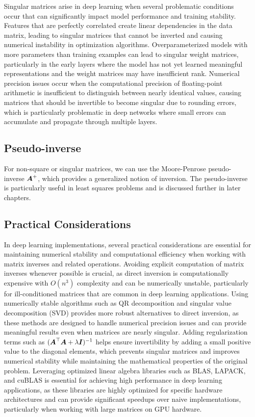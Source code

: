 Singular matrices arise in deep learning when several problematic conditions occur that can significantly impact model performance and training stability. Features that are perfectly correlated create linear dependencies in the data matrix, leading to singular matrices that cannot be inverted and causing numerical instability in optimization algorithms. Overparameterized models with more parameters than training examples can lead to singular weight matrices, particularly in the early layers where the model has not yet learned meaningful representations and the weight matrices may have insufficient rank. Numerical precision issues occur when the computational precision of floating-point arithmetic is insufficient to distinguish between nearly identical values, causing matrices that should be invertible to become singular due to rounding errors, which is particularly problematic in deep networks where small errors can accumulate and propagate through multiple layers.

\subsection{Pseudo-inverse}

For non-square or singular matrices, we can use the Moore-Penrose pseudo-inverse $\boldsymbol{A}^+$, which provides a generalized notion of inversion. The pseudo-inverse is particularly useful in least squares problems and is discussed further in later chapters.

\subsection{Practical Considerations}

In deep learning implementations, several practical considerations are essential for maintaining numerical stability and computational efficiency when working with matrix inverses and related operations. Avoiding explicit computation of matrix inverses whenever possible is crucial, as direct inversion is computationally expensive with $O(n^3)$ complexity and can be numerically unstable, particularly for ill-conditioned matrices that are common in deep learning applications. Using numerically stable algorithms such as QR decomposition and singular value decomposition (SVD) provides more robust alternatives to direct inversion, as these methods are designed to handle numerical precision issues and can provide meaningful results even when matrices are nearly singular. Adding regularization terms such as $(\boldsymbol{A}^\top\boldsymbol{A} + \lambda\boldsymbol{I})^{-1}$ helps ensure invertibility by adding a small positive value to the diagonal elements, which prevents singular matrices and improves numerical stability while maintaining the mathematical properties of the original problem. Leveraging optimized linear algebra libraries such as BLAS, LAPACK, and cuBLAS is essential for achieving high performance in deep learning applications, as these libraries are highly optimized for specific hardware architectures and can provide significant speedups over naive implementations, particularly when working with large matrices on GPU hardware.
